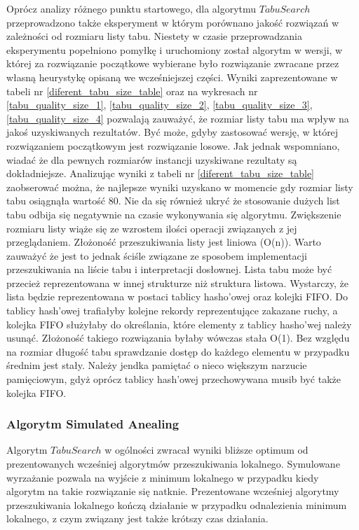 Oprócz analizy różnego punktu startowego, dla algorytmu $Tabu Search$
przeprowadzono także eksperyment w którym porównano jakość rozwiązań
w zależności od rozmiaru listy tabu. Niestety w czasie przeprowadzania
eksperymentu popełniono pomyłkę i uruchomiony został algorytm w wersji,
w której za rozwiązanie początkowe wybierane było rozwiązanie zwracane
przez własną heurystykę opisaną we wcześniejszej części. Wyniki
zaprezentowane w tabeli nr \ref{diferent_tabu_size_table} oraz
na wykresach nr \ref{tabu_quality_size_1}, \ref{tabu_quality_size_2},
\ref{tabu_quality_size_3}, \ref{tabu_quality_size_4} pozwalają
zauważyć, że rozmiar listy tabu ma wpływ na jakoś uzyskiwanych 
rezultatów. Być może, gdyby zastosować wersję, w której rozwiązaniem
początkowym jest rozwiązanie losowe. Jak jednak wspomniano, wiadać że
dla pewnych rozmiarów instancji uzyskiwane rezultaty są dokładniejsze.
Analizując wyniki z tabeli nr \ref{diferent_tabu_size_table}
zaobserować można, że najlepsze wyniki uzyskano w momencie gdy rozmiar
listy tabu osiągnąła wartość 80. Nie da się również ukryć że stosowanie
dużych list tabu odbija się negatywnie na czasie wykonywania się
algorytmu. Zwiększenie rozmiaru listy wiąże się ze wzrostem ilości
operacji związanych z jej przeglądaniem. Złożoność
przeszukiwania listy jest liniowa (O(n)). Warto zauważyć że jest to
jednak ściśle związane ze sposobem implementacji przeszukiwania
na liście tabu i interpretacji dosłownej. Lista tabu może być przecież
reprezentowana w innej strukturze niż struktura listowa. Wystarczy,
że lista będzie reprezentowana w postaci tablicy hasho'owej oraz
kolejki FIFO. Do tablicy hash'owej trafiałyby kolejne rekordy
reprezentujące zakazane ruchy, a kolejka FIFO służyłaby do określania,
które elementy z tablicy hasho'wej należy usunąć. Złożoność takiego
rozwiązania byłaby wówczas stała O(1). Bez względu na rozmiar długość
tabu sprawdzanie dostęp do każdego elementu w przypadku średnim
jest stały. Należy jendka pamiętać o nieco większym narzucie pamięciowym,
gdyż oprócz tablicy hash'owej przechowywana musib być także kolejka FIFO.


\subsubsection {Algorytm Simulated Anealing}

Algorytm $Tabu Search$ w ogólności zwracał wyniki bliższe optimum od
prezentowanych wcześniej algorytmów przeszukiwania lokalnego. Symulowane
wyrzażanie pozwala na wyjście z minimum lokalnego w przypadku
kiedy algorytm na takie rozwiązanie się natknie. Prezentowane wcześniej
algorytmy przeszukiwania lokalnego kończą działanie w przypadku
odnalezienia minimum lokalnego, z czym związany jest także krótszy
czas działania.

